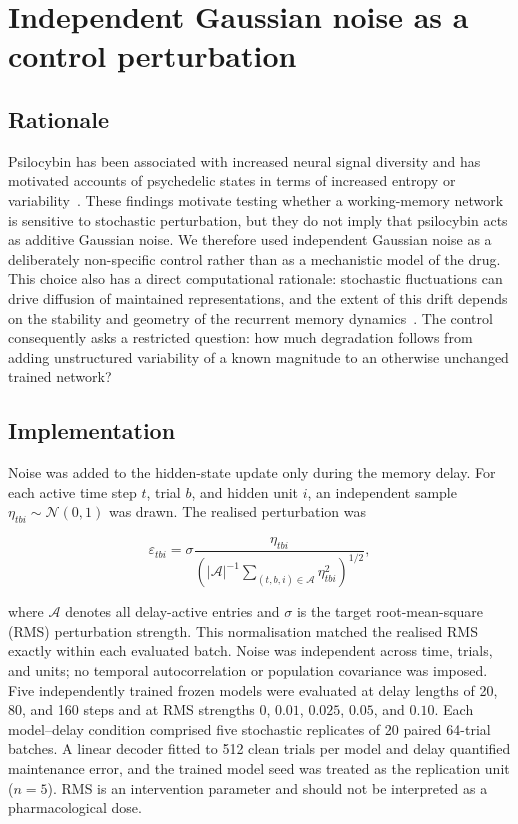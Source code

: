 \documentclass[aps,reprint,amsmath,amssymb,nofootinbib,floatfix]{revtex4-2}
\begin{document}
\section{Independent Gaussian noise as a control perturbation}

\subsection{Rationale}

Psilocybin has been associated with increased neural signal diversity and has
motivated accounts of psychedelic states in terms of increased entropy or
variability~\cite{carhartharris2014,schartner2017}. These findings motivate
testing whether a working-memory network is sensitive to stochastic
perturbation, but they do not imply that psilocybin acts as additive Gaussian
noise. We therefore used independent Gaussian noise as a deliberately
non-specific control rather than as a mechanistic model of the drug. This
choice also has a direct computational rationale: stochastic fluctuations can
drive diffusion of maintained representations, and the extent of this drift
depends on the stability and geometry of the recurrent memory
dynamics~\cite{kilpatrick2013,ghazizadeh2021}. The control consequently asks a
restricted question: how much degradation follows from adding unstructured
variability of a known magnitude to an otherwise unchanged trained network?

\subsection{Implementation}

Noise was added to the hidden-state update only during the memory delay. For
each active time step $t$, trial $b$, and hidden unit $i$, an independent sample
$\eta_{tbi}\sim\mathcal{N}(0,1)$ was drawn. The realised perturbation was

\begin{equation}
\varepsilon_{tbi}=
\sigma\frac{\eta_{tbi}}
{\left(|\mathcal{A}|^{-1}\sum_{(t,b,i)\in\mathcal{A}}
\eta_{tbi}^{2}\right)^{1/2}},
\label{eq:gaussian-control}
\end{equation}

where $\mathcal{A}$ denotes all delay-active entries and $\sigma$ is the target
root-mean-square (RMS) perturbation strength. This normalisation matched the
realised RMS exactly within each evaluated batch. Noise was independent across
time, trials, and units; no temporal autocorrelation or population covariance
was imposed. Five independently trained frozen models were evaluated at delay
lengths of 20, 80, and 160 steps and at RMS strengths $0$, $0.01$, $0.025$,
$0.05$, and $0.10$. Each model--delay condition comprised five stochastic
replicates of 20 paired 64-trial batches. A linear decoder fitted to 512 clean
trials per model and delay quantified maintenance error, and the trained model
seed was treated as the replication unit ($n=5$). RMS is an intervention
parameter and should not be interpreted as a pharmacological dose.
\end{document}
